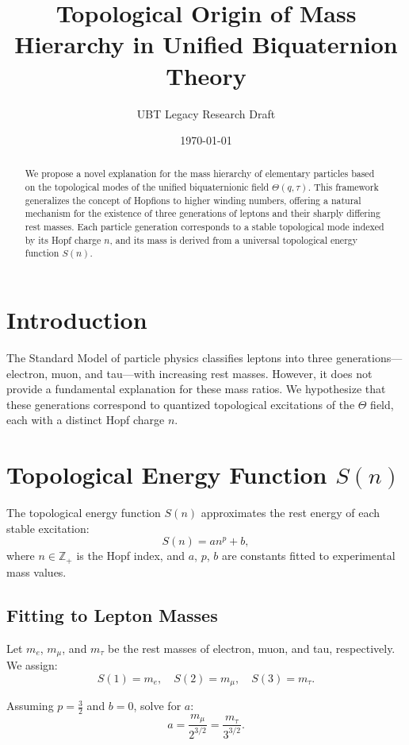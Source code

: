 \documentclass[12pt]{article}
\title{Topological Origin of Mass Hierarchy in Unified Biquaternion Theory}
\author{UBT Legacy Research Draft} %
\date{\today}
\begin{document}
\maketitle

\begin{abstract}
We propose a novel explanation for the mass hierarchy of elementary particles based on the topological modes of the unified biquaternionic field $\Theta(q, \tau)$. This framework generalizes the concept of Hopfions to higher winding numbers, offering a natural mechanism for the existence of three generations of leptons and their sharply differing rest masses. Each particle generation corresponds to a stable topological mode indexed by its Hopf charge $n$, and its mass is derived from a universal topological energy function $S(n)$.
\end{abstract}

\section{Introduction}

The Standard Model of particle physics classifies leptons into three generations---electron, muon, and tau---with increasing rest masses. However, it does not provide a fundamental explanation for these mass ratios. We hypothesize that these generations correspond to quantized topological excitations of the $\Theta$ field, each with a distinct Hopf charge $n$.

\section{Topological Energy Function $S(n)$}

The topological energy function $S(n)$ approximates the rest energy of each stable excitation:
\[
S(n) = a n^p + b,
\]
where $n \in \mathbb{Z}_+$ is the Hopf index, and $a$, $p$, $b$ are constants fitted to experimental mass values.

\subsection{Fitting to Lepton Masses}

Let $m_e$, $m_\mu$, and $m_\tau$ be the rest masses of electron, muon, and tau, respectively. We assign:
\[
S(1) = m_e,\quad S(2) = m_\mu,\quad S(3) = m_\tau.
\]

Assuming $p = \frac{3}{2}$ and $b = 0$, solve for $a$:
\[
a = \frac{m_\mu}{2^{3/2}} = \frac{m_\tau}{3^{3/2}}.
\]
\end{document}
